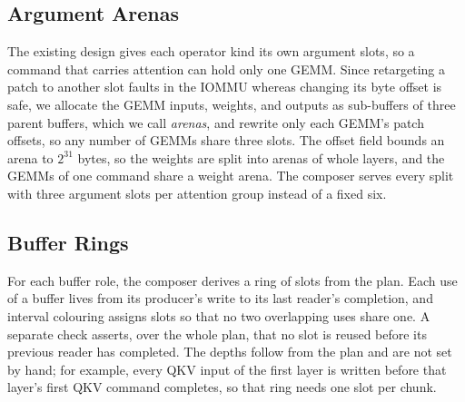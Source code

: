\subsection{Argument Arenas}
\label{app:arenas}

The existing design gives each operator kind its own argument slots, so a command that carries attention can hold only one GEMM.
Since retargeting a patch to another slot faults in the IOMMU whereas changing its byte offset is safe, we allocate the GEMM inputs, weights, and outputs as sub-buffers of three parent buffers, which we call \emph{arenas}, and rewrite only each GEMM's patch offsets, so any number of GEMMs share three slots.
The offset field bounds an arena to $2^{31}$ bytes, so the weights are split into arenas of whole layers, and the GEMMs of one command share a weight arena.
The composer serves every split with three argument slots per attention group instead of a fixed six.

\subsection{Buffer Rings}
\label{app:rings}

For each buffer role, the composer derives a ring of slots from the plan.
Each use of a buffer lives from its producer's write to its last reader's completion, and interval colouring assigns slots so that no two overlapping uses share one.
A separate check asserts, over the whole plan, that no slot is reused before its previous reader has completed.
The depths follow from the plan and are not set by hand; for example, every QKV input of the first layer is written before that layer's first QKV command completes, so that ring needs one slot per chunk.

